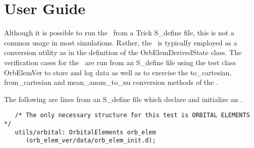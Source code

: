 \chapter{User Guide}\label{ch:user}
%
%
%
Although it is possible to run the \OrbitalElement\ from a Trick S\_define file, this is not a common usage in most
simulations.  Rather, the \OrbitalElement\ is typically employed as a conversion utility as in the definition of the
OrbElemDerivedState class.  The verification cases for the \OrbitalElement\
are run from an S\_define file using the test class OrbElemVer to store and log data as well as to exercise the to\_cartesian, from\_cartesian and mean\_anom\_to\_nu conversion methods of the \OrbitalElement.

The following are lines from an S\_define file which declare and initialize an \OrbitalElement.

\begin{verbatim}
   /* The only necessary structure for this test is ORBITAL ELEMENTS */
   utils/orbital: OrbitalElements orb_elem
      (orb_elem_ver/data/orb_elem_init.d);
\end{verbatim}

